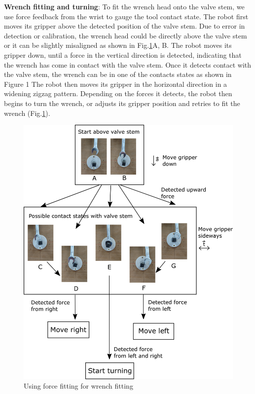 \documentclass{standalone}
\begin{document}
\textbf{Wrench fitting and turning}: To fit the wrench head onto the valve stem, we use force feedback from the wrist to gauge the tool contact state. The robot first moves its gripper above the detected position of the valve stem. Due to error in detection or calibration, the wrench head could be directly above the valve stem or it can be slightly misaligned as shown in Fig.\ref{fig:figure4}A, B. The robot moves its gripper down, until a force in the vertical direction is detected, indicating that the wrench has come in contact with the valve stem. Once it detects contact with the valve stem, the wrench can be in one of the contacts states as shown in Figure 1 The robot then moves its gripper in the horizontal direction in a widening zigzag pattern. Depending on the forces it detects, the robot then begins to turn the wrench, or adjusts its gripper position and retries to fit the wrench (Fig.\ref{fig:figure4}).


\begin{figure}
  \includegraphics[width=\columnwidth]{sections/task2/images/figure4}
  \caption{Using force fitting for wrench fitting}
  \label{fig:figure4}
\end{figure}
\end{document}
